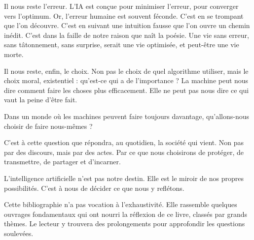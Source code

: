 Il nous reste l'erreur. L'IA est conçue pour minimiser l'erreur, pour converger vers l'optimum. Or, l'erreur humaine est souvent féconde. C'est en se trompant que l'on découvre. C'est en suivant une intuition fausse que l'on ouvre un chemin inédit. C'est dans la faille de notre raison que naît la poésie. Une vie sans erreur, sans tâtonnement, sans surprise, serait une vie optimisée, et peut-être une vie morte.

Il nous reste, enfin, le choix. Non pas le choix de quel algorithme utiliser, mais le choix moral, existentiel : qu'est-ce qui a de l'importance ? La machine peut nous dire comment faire les choses plus efficacement. Elle ne peut pas nous dire ce qui vaut la peine d'être fait.

\begin{aiquote}
Dans un monde où les machines peuvent faire toujours davantage, qu'allons-nous choisir de faire nous-mêmes ?
\end{aiquote}

C'est à cette question que répondra, au quotidien, la société qui vient. Non pas par des discours, mais par des actes. Par ce que nous choisirons de protéger, de transmettre, de partager et d'incarner.

L'intelligence artificielle n'est pas notre destin. Elle est le miroir de nos propres possibilités. C'est à nous de décider ce que nous y reflétons.


Cette bibliographie n'a pas vocation à l'exhaustivité. Elle rassemble quelques ouvrages fondamentaux qui ont nourri la réflexion de ce livre, classés par grands thèmes. Le lecteur y trouvera des prolongements pour approfondir les questions soulevées.






